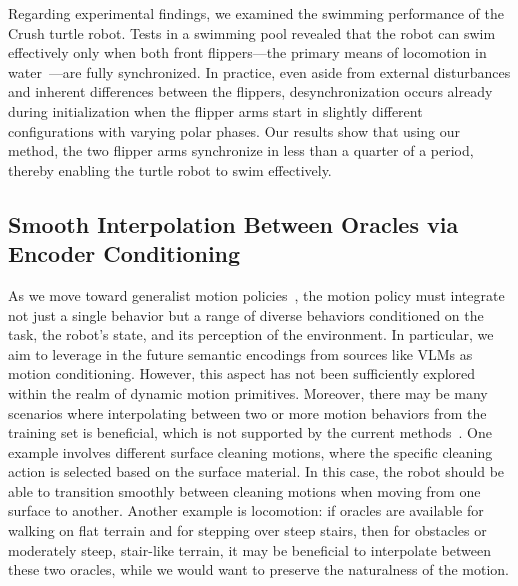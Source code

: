 Regarding experimental findings, we examined the swimming performance of the Crush turtle robot. Tests in a swimming pool revealed that the robot can swim effectively only when both front flippers—the primary means of locomotion in water~\citep{van2022new, van2023soft}—are fully synchronized. In practice, even aside from external disturbances and inherent differences between the flippers, desynchronization occurs already during initialization when the flipper arms start in slightly different configurations with varying polar phases. Our results show that using our method, the two flipper arms synchronize in less than a quarter of a period, thereby enabling the turtle robot to swim effectively.

\subsection{Smooth Interpolation Between Oracles via Encoder Conditioning}

As we move toward generalist motion policies~\citep{o2024open, black2024pi0, gemini2025robotics}, the motion policy must integrate not just a single behavior but a range of diverse behaviors conditioned on the task, the robot’s state, and its perception of the environment. In particular, we aim to leverage in the future semantic encodings from sources like \glspl{VLM} as motion conditioning. However, this aspect has not been sufficiently explored within the realm of dynamic motion primitives. Moreover, there may be many scenarios where interpolating between two or more motion behaviors from the training set is beneficial, which is not supported by the current methods~\citep{rana2020euclideanizing, perez2023stable, perez2024puma, sochopoulos2024learning, zhi2024teaching}.
%
One example involves different surface cleaning motions, where the specific cleaning action is selected based on the surface material. In this case, the robot should be able to transition smoothly between cleaning motions when moving from one surface to another. Another example is locomotion: if oracles are available for walking on flat terrain and for stepping over steep stairs, then for obstacles or moderately steep, stair-like terrain, it may be beneficial to interpolate between these two oracles, while we would want to preserve the naturalness of the motion.

